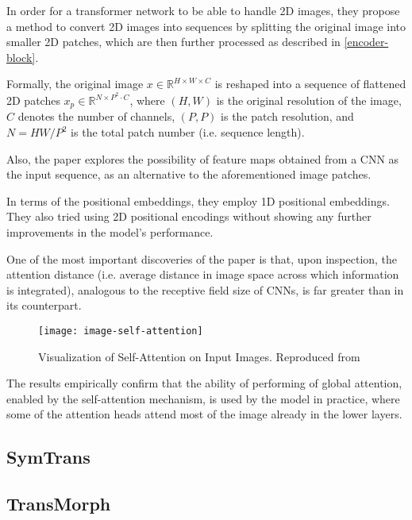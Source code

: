 In order for a transformer network to be able to handle 2D images, they propose a method to convert 2D images into sequences by splitting the original image into smaller 2D patches, which are then further processed as described in \ref{encoder-block}.

Formally, the original image $x \in \mathbb{R}^{H \times W \times C}$ is reshaped into a sequence of flattened 2D patches $x_p \in \mathbb{R}^{N \times P^2 \cdot C}$, where $(H,W)$ is the original resolution of the image, $C$ denotes the number of channels, $(P,P)$ is the patch resolution, and $N=HW/P^2$ is the total patch number (i.e. sequence length).

Also, the paper explores the possibility of feature maps obtained from a CNN as the input sequence, as an alternative to the aforementioned image patches.

In terms of the positional embeddings, they employ 1D positional embeddings. They also tried using 2D positional encodings without showing any further improvements in the model's performance.

One of the most important discoveries of the paper is that, upon inspection, the attention distance (i.e. average distance in image space across which information is integrated), analogous to the receptive field size of CNNs, is far greater than in its counterpart. 

\begin{figure}[h!]
    \texttt{[image: image-self-attention]}
    \caption{Visualization of Self-Attention on Input Images. Reproduced from }
    \label{fig:image-self-attention}
\end{figure}

The results empirically confirm that the ability of performing of global attention, enabled by the self-attention mechanism, is used by the model in practice, where some of the attention heads attend most of the image already in the lower layers.

\subsection{SymTrans}
\label{symtrans}

\subsection{TransMorph}
\label{transmorph}

